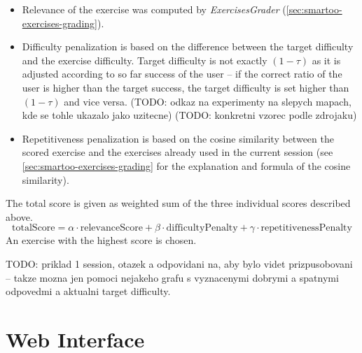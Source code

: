 \documentclass[a4paper, 12pt, twoside]{fithesis2}		%
\renewcommand{\_}{\leavevmode \kern0.07em\vbox{\hrule width0.4em}}
\newcommand{\squarebullet}{\textcolor{black}{\raisebox{0.15em}{\rule{4pt}{4pt}}}}
\newcommand{\emptysquarebullet}{\textcolor{black}{\raisebox{0.10em}{\tiny$\square$}}}
\newenvironment{myItemize}{
  \begin{itemize}[leftmargin=2em,rightmargin=1em,itemsep=\parskip ,parsep=0em,topsep=0em,partopsep=0em]
  \renewcommand{\labelitemi}{\squarebullet}
  \renewcommand{\labelitemii}{\textbullet}
}{
  \end{itemize}
}
\begin{document}
\begin{myItemize}
  \item Relevance of the exercise was computed by \textit{ExercisesGrader}
(\autoref{sec:smartoo-exercises-grading}).

  \item Difficulty penalization is based on the difference between the target difficulty and the exercise difficulty.
Target difficulty is not exactly $(1 - \tau)$ as it is adjusted according to
so far success of the user -- if the correct ratio of the user is higher than the target success,
the target difficulty is set higher than $(1 - \tau)$ and vice versa.
(TODO: odkaz na experimenty na slepych mapach, kde se tohle ukazalo jako uzitecne)
(TODO: konkretni vzorec podle zdrojaku)

  \item Repetitiveness penalization is based on the cosine similarity between the scored exercise and the exercises already used in the current session
(see \autoref{sec:smartoo-exercises-grading} for the explanation and formula of the cosine similarity).
\end{myItemize}
The total score is given as weighted sum of the three individual scores described above.
$$
\text{totalScore} = \alpha \cdot \text{relevanceScore} + \beta \cdot \text{difficultyPenalty} + \gamma \cdot \text{repetitivenessPenalty}
$$
An exercise with the highest score is chosen.

TODO: priklad 1 session, otazek a odpovidani na, aby bylo videt prizpusobovani -- takze mozna jen pomoci nejakeho grafu s vyznacenymi dobrymi a spatnymi odpovedmi a aktualni target difficulty.


\section{Web Interface}
\label{sec:smartoo-web}
\end{document}
